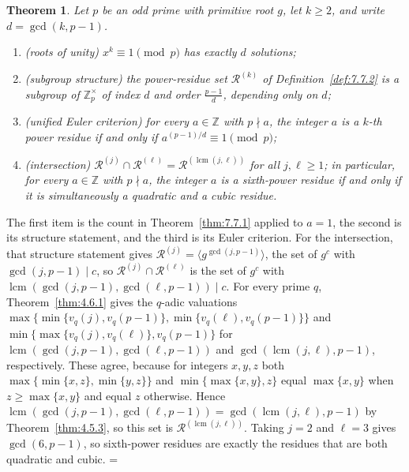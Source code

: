 \documentclass[11pt]{article}
\makeatletter
\let\nt@closedisplay\]
\def\nt@guardedclose{\@ifnextchar\par{\nt@closeafterpar}{\@ifnextchar\end{\postdisplaypenalty\@M\nt@closedisplay}{\nt@closedisplay}}}
\def\nt@closeafterpar\par{\@ifnextchar\par{\nt@closeafterpar}{\@ifnextchar\end{\postdisplaypenalty\@M\nt@closedisplay\par}{\nt@closedisplay\par}}}
\renewenvironment{proof}[1][\proofname]{\par
  \pushQED{\qed}\normalfont\topsep\medskipamount\edef\nt@afterproof{\@endparpenalty=\the\@endparpenalty\relax}\@beginparpenalty\@M\@endparpenalty\@M\let\]\nt@guardedclose\trivlist\item[]\textit{#1\@addpunct{.}} \ignorespaces}{\ifvmode\addpenalty\@M\fi\popQED\nt@afterproof\endtrivlist\@endpefalse}
\theoremstyle{ntstyle}
\newtheorem{theorem}{Theorem}[subsection]
\newcommand{\ZmodUnits}[1]{\mathbb{Z}_{#1}^{\times}}
\DeclareMathOperator{\lcm}{lcm}
\makeatother
\begin{document}
\begin{theorem}\label{thm:7.7.7} Let $p$ be an odd
  prime with primitive root $g$, let $k \ge 2$, and write $d = \gcd(k, p-1)$.

  \begin{enumerate}[label={\alph*)}]
    \item (roots of unity) $x^{k} \equiv 1 \pmod{p}$ has exactly $d$ solutions;
    \item (subgroup structure) the power-residue set $\mathcal{R}^{(k)}$ of
          Definition~\ref{def:7.7.2} is a subgroup of $\ZmodUnits{p}$ of index
          $d$ and order $\tfrac{p-1}{d}$, depending only on $d$;
    \item (unified Euler criterion) for every $a\in\mathbb{Z}$ with
          $p\nmid a$, the integer $a$ is a $k$-th power residue if and only if
          $a^{(p-1)/d} \equiv 1 \pmod{p}$;
    \item (intersection) $\mathcal{R}^{(j)} \cap \mathcal{R}^{(\ell)} = \mathcal{R}^{(\lcm(j, \ell))}$ for all
    $j, \ell \ge 1$; in
          particular, for every $a\in\mathbb{Z}$ with $p\nmid a$, the integer $a$ is a
          sixth-power residue if and only if it is simultaneously a quadratic and a
          cubic residue.
  \end{enumerate}

\end{theorem}

\begin{proof} The first item is the count in Theorem~\ref{thm:7.7.1}
  applied to $a = 1$, the second is its structure statement, and the third is
  its Euler criterion. For the intersection, that
  structure statement gives $\mathcal{R}^{(j)} = \langle g^{\gcd(j, p-1)}\rangle$, the set of $g^{c}$ with
  $\gcd(j, p-1) \mid c$, so
  $\mathcal{R}^{(j)} \cap \mathcal{R}^{(\ell)}$ is the set of $g^{c}$ with
  $\lcm(\gcd(j, p-1), \gcd(\ell, p-1)) \mid c$. For every prime $q$,
  Theorem~\ref{thm:4.6.1} gives the $q$-adic valuations
  $\max\{\min\{v_q(j),v_q(p-1)\},\min\{v_q(\ell),v_q(p-1)\}\}$ and
  $\min\{\max\{v_q(j),v_q(\ell)\},v_q(p-1)\}$ for $\lcm(\gcd(j, p-1), \gcd(\ell, p-1))$
  and $\gcd(\lcm(j, \ell), p-1)$, respectively. These agree, because for integers
  $x,y,z$ both $\max\{\min\{x,z\},\min\{y,z\}\}$ and $\min\{\max\{x,y\},z\}$ equal
  $\max\{x,y\}$ when $z\ge\max\{x,y\}$ and equal $z$ otherwise. Hence
  $\lcm(\gcd(j, p-1), \gcd(\ell, p-1)) = \gcd(\lcm(j, \ell), p-1)$ by Theorem~\ref{thm:4.5.3}, so this set is
  $\mathcal{R}^{(\lcm(j, \ell))}$. Taking $j = 2$ and $\ell = 3$
  gives $\gcd(6, p-1)$, so sixth-power residues are exactly the residues
  that are both quadratic and cubic.
\end{proof}
\end{document}
